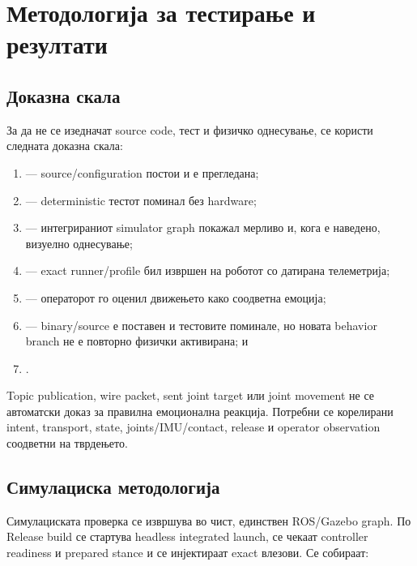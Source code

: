 \chapter{Методологија за тестирање и резултати}
\label{chap:results}

\section{Доказна скала}

За да не се изедначат source code, тест и физичко однесување, се користи
следната доказна скала:

\begin{enumerate}
  \item {} --- source/configuration постои и е
  прегледана;
  \item {} --- deterministic тестот поминал без
  hardware;
  \item {} --- интегрираниот simulator graph покажал
  мерливо и, кога е наведено, визуелно однесување;
  \item {} --- exact runner/profile бил извршен на
  роботот со датирана телеметрија;
  \item {} --- операторот го оценил движењето како
  соодветна емоција;
  \item {} --- binary/source е
  поставен и тестовите поминале, но новата behavior branch не е повторно
  физички активирана; и
  \item {}.
\end{enumerate}

Topic publication, wire packet, sent joint target или joint movement не се
автоматски доказ за правилна емоционална реакција. Потребни се корелирани
intent, transport, state, joints/IMU/contact, release и operator observation
соодветни на тврдењето.

\section{Симулациска методологија}

Симулациската проверка се извршува во чист, единствен ROS/Gazebo graph. По
Release build се стартува headless integrated launch, се чекаат controller
readiness и prepared stance и се инјектираат exact 
влезови. Се собираат:

